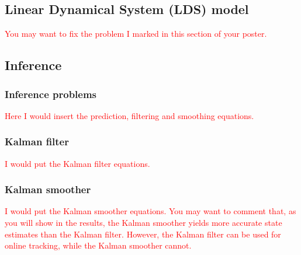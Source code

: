 \documentclass[12pt]{article}
\begin{document}
\subsection{Linear Dynamical System (LDS) model}

\textcolor{red}{You may want to fix the problem I marked in this section of
your poster.}

\subsection{Inference}

\subsubsection{Inference problems}

\textcolor{red}{Here I would insert the prediction, filtering and smoothing
equations.}

\subsubsection{Kalman filter}
\label{sec:kf}

\textcolor{red}{I would put the Kalman filter equations.}

\subsubsection{Kalman smoother}
\label{sec:ks}

\textcolor{red}{I would put the Kalman smoother equations. You may want to
comment that, as you will show in the results, the Kalman smoother yields more
accurate state estimates than the Kalman filter. However, the Kalman filter can
be used for online tracking, while the Kalman smoother cannot.}
\end{document}
